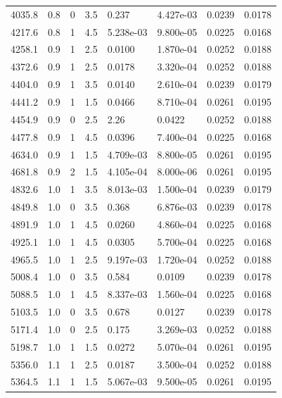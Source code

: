 \documentclass[preview]{standalone}
\begin{document}
{{{\begin{tabular}{L{1.2cm}C{1.2cm} C{0.3cm}C{0.5cm} C{1.4cm}C{1.4cm} C{1.4cm}C{1.4cm}}
  4035.8  &   0.8  & 0     & 3.5 &  0.237  & 4.427e-03  & 0.0239 &  0.0178   \\ 
  4217.6  &   0.8  & 1     & 4.5 &  5.238e-03  & 9.800e-05  & 0.0225 &  0.0168   \\ 
  4258.1  &   0.9  & 1     & 2.5 &  0.0100  & 1.870e-04  & 0.0252 &  0.0188   \\ 
  4372.6  &   0.9  & 1     & 2.5 &  0.0178  & 3.320e-04  & 0.0252 &  0.0188   \\ 
  4404.0  &   0.9  & 1     & 3.5 &  0.0140  & 2.610e-04  & 0.0239 &  0.0179   \\ 
  4441.2  &   0.9  & 1     & 1.5 &  0.0466  & 8.710e-04  & 0.0261 &  0.0195   \\ 
  4454.9  &   0.9  & 0     & 2.5 &  2.26  & 0.0422  & 0.0252 &  0.0188   \\ 
  4477.8  &   0.9  & 1     & 4.5 &  0.0396  & 7.400e-04  & 0.0225 &  0.0168   \\ 
  4634.0  &   0.9  & 1     & 1.5 &  4.709e-03  & 8.800e-05  & 0.0261 &  0.0195   \\ 
  4681.8  &   0.9  & 2     & 1.5 &  4.105e-04  & 8.000e-06  & 0.0261 &  0.0195   \\ 
  4832.6  &   1.0  & 1     & 3.5 &  8.013e-03  & 1.500e-04  & 0.0239 &  0.0179   \\ 
  4849.8  &   1.0  & 0     & 3.5 &  0.368  & 6.876e-03  & 0.0239 &  0.0178   \\ 
  4891.9  &   1.0  & 1     & 4.5 &  0.0260  & 4.860e-04  & 0.0225 &  0.0168   \\ 
  4925.1  &   1.0  & 1     & 4.5 &  0.0305  & 5.700e-04  & 0.0225 &  0.0168   \\ 
  4965.5  &   1.0  & 1     & 2.5 &  9.197e-03  & 1.720e-04  & 0.0252 &  0.0188   \\ 
  5008.4  &   1.0  & 0     & 3.5 &  0.584  & 0.0109  & 0.0239 &  0.0178   \\ 
  5088.5  &   1.0  & 1     & 4.5 &  8.337e-03  & 1.560e-04  & 0.0225 &  0.0168   \\ 
  5103.5  &   1.0  & 0     & 3.5 &  0.678  & 0.0127  & 0.0239 &  0.0178   \\ 
  5171.4  &   1.0  & 0     & 2.5 &  0.175  & 3.269e-03  & 0.0252 &  0.0188   \\ 
  5198.7  &   1.0  & 1     & 1.5 &  0.0272  & 5.070e-04  & 0.0261 &  0.0195   \\ 
  5356.0  &   1.1  & 1     & 2.5 &  0.0187  & 3.500e-04  & 0.0252 &  0.0188   \\ 
  5364.5  &   1.1  & 1     & 1.5 &  5.067e-03  & 9.500e-05  & 0.0261 &  0.0195   \\ 

\end{tabular}}}}
\end{document}
